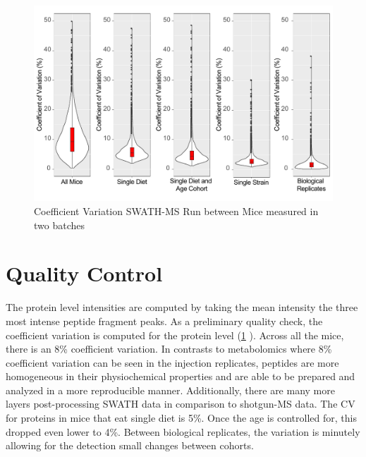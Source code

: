 \documentclass[a4paper,11pt,twoside]{book}
\begin{document}
	\begin{figure}[htb!]
		\includegraphics[width=\linewidth]{3.Proteomics/protein_cvs_figure.pdf}
		\caption{Coefficient Variation SWATH-MS Run between Mice measured in two batches}
		\label{CV Analysis Proteomic Data}
	\end{figure}
	
	\section{Quality Control}
     
    The protein level intensities are computed by taking the mean intensity the three most intense peptide fragment peaks. As a preliminary quality check, the coefficient variation is computed for the protein level (\ref{CV Analysis Proteomic Data} ). Across all the mice, there is an 8\% coefficient variation. In contrasts to metabolomics where 8\% coefficient variation can be seen in the injection replicates, peptides are more homogeneous in their physiochemical properties and are able to be prepared and analyzed in a more reproducible manner. Additionally, there are many more layers post-processing SWATH data in comparison to shotgun-MS data. The CV for proteins in mice that eat single diet is 5\%. Once the age is controlled for, this dropped even lower to 4\%. Between biological replicates, the variation is minutely allowing for the detection small changes between cohorts.
    
\end{document}
